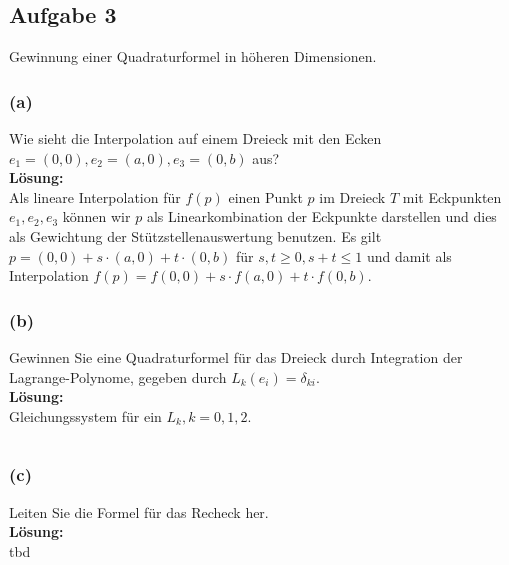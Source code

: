 \documentclass[11pt,a4paper,ngerman]{article}
\begin{document}
\subsection*{Aufgabe 3}

Gewinnung einer Quadraturformel in höheren Dimensionen.

\subsubsection*{(a)}
Wie sieht die Interpolation auf einem Dreieck mit den Ecken $e_1 = (0,0), e_2 = (a,0), e_3 = (0,b)$ aus?\\

\textbf{Lösung:}\\
Als lineare Interpolation für $f(p)$ einen Punkt $p$ im Dreieck $T$ mit Eckpunkten $e_1, e_2, e_3$ können wir
$p$ als Linearkombination der Eckpunkte darstellen und dies als Gewichtung der Stützstellenauswertung benutzen.
Es gilt $p = (0,0) + s \cdot (a,0) + t \cdot (0,b)$ für $s,t \geq 0, s + t \leq 1$ und damit als Interpolation
$f(p) = f(0,0) + s \cdot f(a,0) + t \cdot f(0,b)$.

\subsubsection*{(b)}
Gewinnen Sie eine Quadraturformel für das Dreieck durch Integration der Lagrange-Polynome, gegeben
durch $L_k(e_i) = \delta_{ki}$.\\

\textbf{Lösung:}\\
Gleichungssystem für ein $L_k, k = 0,1,2$.

\begin{equation*}

\end{equation*}

\subsubsection*{(c)}
Leiten Sie die Formel für das Recheck her.\\

\textbf{Lösung:}\\
tbd


\label{LastPage}
\end{document}
